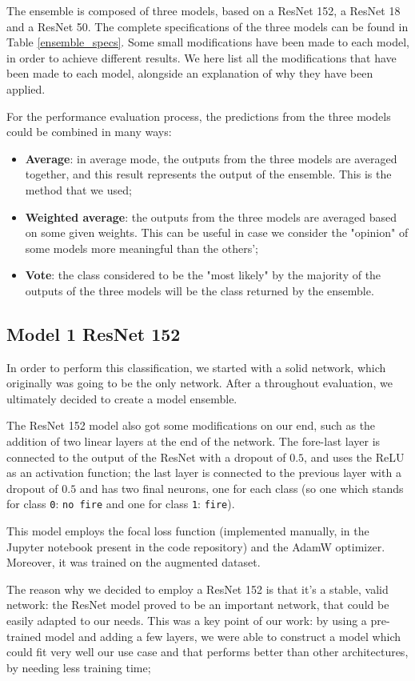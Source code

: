 \documentclass[11pt, journal]{IEEEtran}
\newcommand{\nl}{

\medskip

}
\begin{document}
The ensemble is composed of three models, based on a ResNet 152, a ResNet 18 and a ResNet 50. The complete specifications of the three models can be found in Table \ref{ensemble_specs}. Some small modifications have been made to each model, in order to achieve different results. We here list all the modifications that have been made to each model, alongside an explanation of why they have been applied.
\nl
For the performance evaluation process, the predictions from the three models could be combined in many ways:
\begin{itemize}
    \item \textbf{Average}: in average mode, the outputs from the three models are averaged together, and this result represents the output of the ensemble. This is the method that we used;
    \item \textbf{Weighted average}: the outputs from the three models are averaged based on some given weights. This can be useful in case we consider the "opinion" of some models more meaningful than the others';
    \item \textbf{Vote}: the class considered to be the "most likely" by the majority of the outputs of the three models will be the class returned by the ensemble.
\end{itemize}

\subsection*{Model 1 \texorpdfstring{\textbullet}{•} ResNet 152}

In order to perform this classification, we started with a solid network, which originally was going to be the only network. After a throughout evaluation, we ultimately decided to create a model ensemble.
\nl
The ResNet 152 model also got some modifications on our end, such as the addition of two linear layers at the end of the network. The fore-last layer is connected to the output of the ResNet with a dropout of $0.5$, and uses the ReLU as an activation function; the last layer is connected to the previous layer with a dropout of $0.5$ and has two final neurons, one for each class (so one which stands for class \texttt{0}: \texttt{no fire} and one for class \texttt{1}: \texttt{fire}).
\nl
This model employs the focal loss function (implemented manually, in the Jupyter notebook present in the code repository) and the AdamW optimizer. Moreover, it was trained on the augmented dataset.
\nl
The reason why we decided to employ a ResNet 152 is that it's a stable, valid network: the ResNet model proved to be an important network, that could be easily adapted to our needs. This was a key point of our work: by using a pre-trained model and adding a few layers, we were able to construct a model which could fit very well our use case and that performs better than other architectures, by needing less training time;
\end{document}
